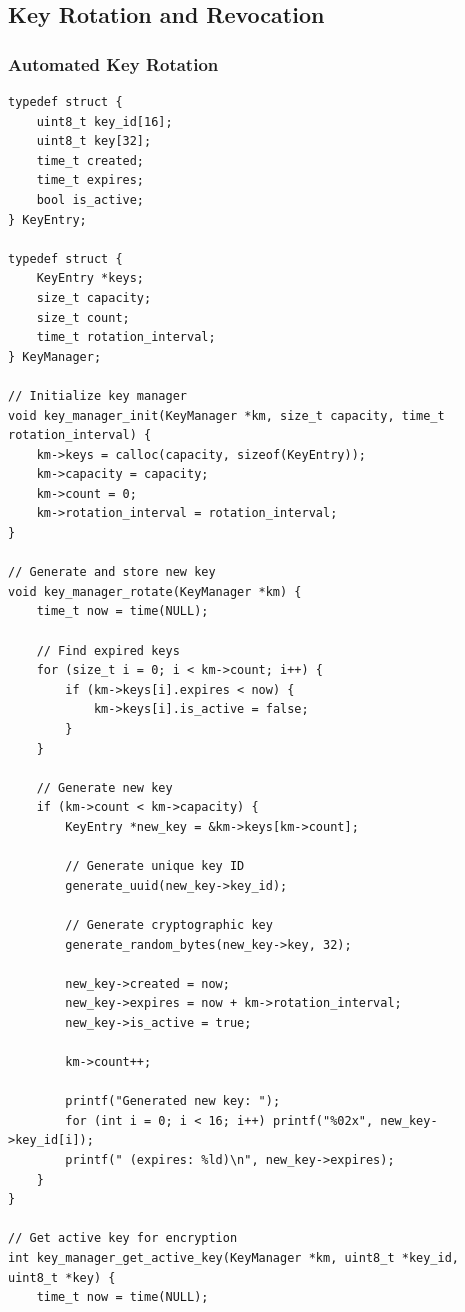 \subsection{Key Rotation and Revocation}

\subsubsection{Automated Key Rotation}

\begin{lstlisting}[style=cstyle, caption={Key Rotation System}]
typedef struct {
    uint8_t key_id[16];
    uint8_t key[32];
    time_t created;
    time_t expires;
    bool is_active;
} KeyEntry;

typedef struct {
    KeyEntry *keys;
    size_t capacity;
    size_t count;
    time_t rotation_interval;
} KeyManager;

// Initialize key manager
void key_manager_init(KeyManager *km, size_t capacity, time_t rotation_interval) {
    km->keys = calloc(capacity, sizeof(KeyEntry));
    km->capacity = capacity;
    km->count = 0;
    km->rotation_interval = rotation_interval;
}

// Generate and store new key
void key_manager_rotate(KeyManager *km) {
    time_t now = time(NULL);
    
    // Find expired keys
    for (size_t i = 0; i < km->count; i++) {
        if (km->keys[i].expires < now) {
            km->keys[i].is_active = false;
        }
    }
    
    // Generate new key
    if (km->count < km->capacity) {
        KeyEntry *new_key = &km->keys[km->count];
        
        // Generate unique key ID
        generate_uuid(new_key->key_id);
        
        // Generate cryptographic key
        generate_random_bytes(new_key->key, 32);
        
        new_key->created = now;
        new_key->expires = now + km->rotation_interval;
        new_key->is_active = true;
        
        km->count++;
        
        printf("Generated new key: ");
        for (int i = 0; i < 16; i++) printf("%02x", new_key->key_id[i]);
        printf(" (expires: %ld)\n", new_key->expires);
    }
}

// Get active key for encryption
int key_manager_get_active_key(KeyManager *km, uint8_t *key_id, uint8_t *key) {
    time_t now = time(NULL);
    

\end{lstlisting}

